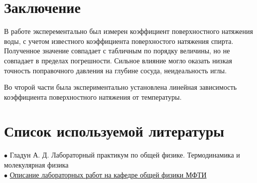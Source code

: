\documentclass[a4paper, 12pt]{article} %
\begin{document}
\begin{figure}[h]
	\label{gr:3}
\end{figure}


\section{Заключение}

В работе эксперементально был измерен коэффициент поверхностного натяжения воды, с учетом известного коэффициента поверхностого натяжения спирта. Полученное значение совпадает с табличным по порядку величины, но не совпадает в пределах погрешности. Сильное влияние могло оказать низкая точность поправочного давления на глубине сосуда, неидеальность иглы.

Во чторой части была экспериментально установлена линейная зависимость коэффициента поверхностного натяжения от температуры.

\section{Список используемой литературы}

$\bullet$ Гладун А. Д. Лабораторный практикум по общей физике. Термодинамика и молекулярная физика\\

$\bullet$ \href{https://mipt.ru/education/chair/physics/S_II/lab/}{Описание лабораторных работ на кафедре общей физики МФТИ}
\end{document}
